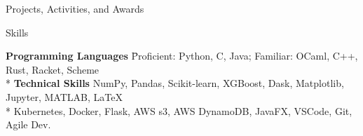 \documentclass{article}
\newlength{\tabin}
\newlength{\secsep}
\newcommand{\lineunder}{\vspace*{-8pt} \\ \hspace*{-6pt} \hrulefill \\ \vspace*{-15pt}}
\newenvironment{tabbedsection}[1]{
  \begin{list}{}{
      \setlength{\itemsep}{0pt}
      \setlength{\labelsep}{0pt}
      \setlength{\labelwidth}{0pt}
      \setlength{\leftmargin}{\tabin}
      \setlength{\rightmargin}{\tabin}
      \setlength{\listparindent}{0pt}
      \setlength{\parsep}{0pt}
      \setlength{\parskip}{0pt}
      \setlength{\partopsep}{0pt}
      \setlength{\topsep}{#1}
    }
  \item[]
}{\end{list}}
\newenvironment{nospacetabbing}{
    \begin{tabbing}
}{\end{tabbing}\vspace{-1.2em}}
\newenvironment{resume_section}[1]{
  \filbreak
  \vspace{2\secsep}
  \textsc{\large#1}
  \lineunder
  \begin{tabbedsection}{\secsep}
}{\end{tabbedsection}}
\newenvironment{resume_subsection}[2][]{
  \textbf{#2} \hfill {\footnotesize #1} \hspace{-4em}
  \begin{tabbedsection}{0.5\secsep}
}{\end{tabbedsection}}
\newenvironment{subitems}{
  \renewcommand{\labelitemi}{-}
  \begin{itemize}
      \setlength{\labelsep}{1em}
}{\end{itemize}}
\begin{document}
\begin{resume_section}{Projects, Activities, and Awards}

  
\end{resume_section}

\begin{resume_section}{Skills}
  \begin{nospacetabbing}
  \textbf{Programming Languages} \= Proficient: Python, C, Java; Familiar: OCaml, C++, Rust, Racket, Scheme\\*
  \textbf{Technical Skills}  \> NumPy, Pandas, Scikit-learn, XGBoost, Dask, Matplotlib, Jupyter, MATLAB, \LaTeX \\ *
  \> Kubernetes, Docker, Flask, AWS s3, AWS DynamoDB, JavaFX, VSCode, Git, Agile Dev.

  \end{nospacetabbing}
\end{resume_section}
\end{document}
